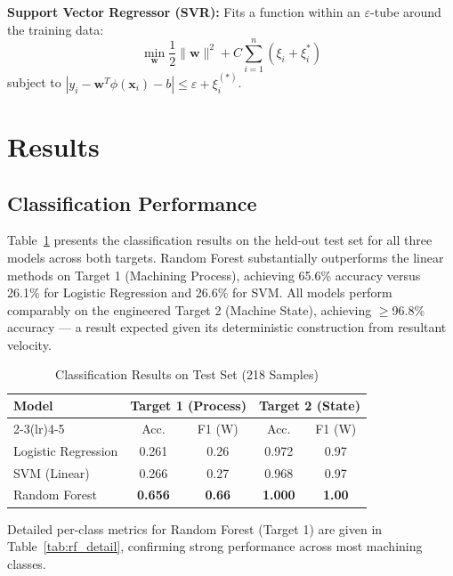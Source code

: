 \documentclass[conference]{IEEEtran}
\begin{document}
\textbf{Support Vector Regressor (SVR):} Fits a function within an $\varepsilon$-tube
around the training data:
\begin{equation}
    \min_{\mathbf{w}} \frac{1}{2}\|\mathbf{w}\|^2 + C\sum_{i=1}^{n}(\xi_i + \xi_i^*)
    \label{eq:svr}
\end{equation}
subject to $|y_i - \mathbf{w}^T\phi(\mathbf{x}_i) - b| \leq \varepsilon + \xi_i^{(*)}$.

\section{Results}
\label{sec:results}

\subsection{Classification Performance}

Table~\ref{tab:clf} presents the classification results on the held-out test set for
all three models across both targets. Random Forest substantially outperforms the
linear methods on Target 1 (Machining Process), achieving 65.6\% accuracy versus
26.1\% for Logistic Regression and 26.6\% for SVM. All models perform comparably on
the engineered Target 2 (Machine State), achieving $\geq$96.8\% accuracy — a result
expected given its deterministic construction from resultant velocity.

\begin{table}[h]
\caption{Classification Results on Test Set (218 Samples)}
\label{tab:clf}
\centering
\begin{tabular}{lcccc}
\toprule
\multirow{2}{*}{\textbf{Model}} &
\multicolumn{2}{c}{\textbf{Target 1 (Process)}} &
\multicolumn{2}{c}{\textbf{Target 2 (State)}} \\
\cmidrule(lr){2-3}\cmidrule(lr){4-5}
 & Acc. & F1 (W) & Acc. & F1 (W) \\
\midrule
Logistic Regression & 0.261 & 0.26 & 0.972 & 0.97 \\
SVM (Linear)        & 0.266 & 0.27 & 0.968 & 0.97 \\
Random Forest       & \textbf{0.656} & \textbf{0.66} & \textbf{1.000} & \textbf{1.00} \\
\bottomrule
\end{tabular}
\end{table}

Detailed per-class metrics for Random Forest (Target 1) are given in
Table~\ref{tab:rf_detail}, confirming strong performance across most machining classes.
\end{document}
